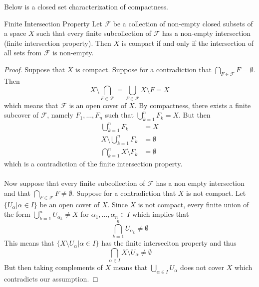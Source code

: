 \documentclass[a4paper]{article}
\begin{document}
Below is a closed set characterization of compactness. 

\begin{thm}{Finite Intersection Property}{} Let $\mathcal{F}$ be a collection of non-empty closed subsets of a space $X$ such that every finite subcollection of $\mathcal{F}$ has a non-empty intersection (finite intersection property). Then $X$ is compact if and only if the intersection of all sets from $\mathcal{F}$ is non-empty. \tcbline
\begin{proof}
Suppose that $X$ is compact. Suppose for a contradiction that $\bigcap_{F\in\mathcal{F}}F=\emptyset$. Then $$X\setminus\bigcap_{F\in\mathcal{F}}=\bigcup_{F\in\mathcal{F}}X\setminus F=X$$ which means that $\mathcal{F}$ is an open cover of $X$. By compactness, there exists a finite subcover of $\mathcal{F}$, namely $F_1,\dots, F_n$ such that $\bigcup_{k=1}^nF_k=X$. But then 
\begin{align*}
\bigcup_{k=1}^nF_k&=X\\
X\setminus\bigcup_{k=1}^nF_k&=\emptyset\\
\bigcap_{k=1}^nX\setminus F_k&=\emptyset
\end{align*}
which is a contradiction of the finite intersection property. \\~\\
Now suppose that every finite subcollection of $\mathcal{F}$ has a non empty intersection and that $\bigcap_{F\in\mathcal{F}}F\neq\emptyset$. Suppose for a contradiction that $X$ is not compact. Let $\{U_\alpha|\alpha\in I\}$ be an open cover of $X$. Since $X$ is not compact, every finite union of the form $\bigcup_{k=1}^nU_{\alpha_k}\neq X$ for $\alpha_1,\dots,\alpha_n\in I$ which implies that $$\bigcap_{k=1}^nU_{\alpha_k}\neq\emptyset$$ This means that $\{X\setminus U_\alpha|\alpha\in I\}$ has the finite interseciton property and thus $$\bigcap_{\alpha\in I}X\setminus U_\alpha\neq\emptyset$$ But then taking complements of $X$ means that $\bigcup_{\alpha\in I}U_\alpha$ does not cover $X$ which contradicts our assumption. 
\end{proof}
\end{thm}
\end{document}

